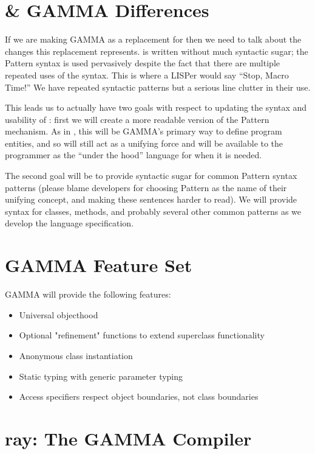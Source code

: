 \documentclass[10pt]{article}
\newcommand{\Lang}{GAMMA}
\newcommand{\Compiler}{ray}
\begin{document}
\section*{ \& \Lang{} Differences}
If we are making \Lang{} as a replacement for  then we need to talk
about the changes this replacement represents.  is written without
much syntactic sugar; the Pattern syntax is used pervasively despite the
fact that there are multiple repeated uses of the syntax. This is where a
LISPer would say ``Stop, Macro Time!'' We have repeated syntactic patterns
but a serious line clutter in their use.

This leads us to actually have two goals with respect to updating the syntax
and usability of : first we will create a more readable version of
the  Pattern mechanism. As in , this will be \Lang{}'s primary
way to define program entities, and so will still act as a unifying force
and will be available to the programmer as the ``under the hood'' language
for when it is needed.

The second goal will be to provide syntactic sugar for common Pattern syntax
patterns (please blame  developers for choosing Pattern as the name
of their unifying concept, and making these sentences harder to read). We will
provide syntax for classes, methods, and probably several other common patterns
as we develop the language specification.

\section*{\Lang{} Feature Set}

\Lang{} will provide the following features:

\begin{itemize}
\item Universal objecthood
\item Optional "refinement" functions to extend superclass functionality
\item Anonymous class instantiation
\item Static typing with generic parameter typing
\item Access specifiers respect object boundaries, not class boundaries
\end{itemize}

\section*{\Compiler{}: The \Lang{} Compiler}
\end{document}
